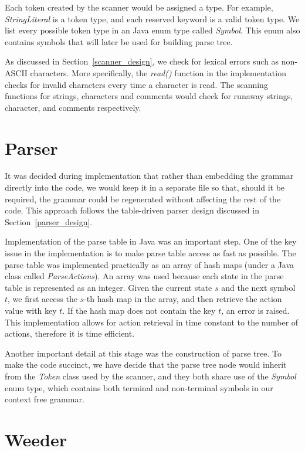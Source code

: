 Each token created by the scanner would be assigned a type. For example, \emph{StringLiteral} is a token type, and each reserved keyword is a valid token type. We list every possible token type in an Java enum type called \emph{Symbol}. This enum also contains symbols that will later be used for building parse tree.

As discussed in Section~\ref{scanner_design}, we check for lexical errors such as non-ASCII characters. More specifically, the \emph{read()} function in the implementation checks for invalid characters every time a character is read. The scanning functions for strings, characters and comments would check for runaway strings, character, and comments respectively.

\section{Parser}

It was decided during implementation that rather than embedding the grammar directly into the code, we would keep it in a separate file so that,
  should it be required, the grammar could be regenerated without affecting the rest of the code. This approach follows the table-driven parser design discussed in Section~\ref{parser_design}.

Implementation of the parse table in Java was an important step. One of the key issue in the implementation is to make parse table access as fast as possible. The parse table was implemented practically as an array of hash maps (under a Java class called \emph{ParseActions}). An array was used because each state in the parse table is represented as an integer. Given the current state $s$ and the next symbol $t$, we first access the $s$-th hash map in the array, and then retrieve the action value with key $t$. If the hash map does not contain the key $t$, an error is raised. This implementation allows for action retrieval in time constant to the number of actions, therefore it is time efficient. 

Another important detail at this stage was the construction of parse tree. To make the code succinct, we have decide that the parse tree node would inherit from the \emph{Token} class used by the scanner, and they both share use of the \emph{Symbol} enum type, which contains both terminal and non-terminal symbols in our context free grammar.

\section{Weeder}

